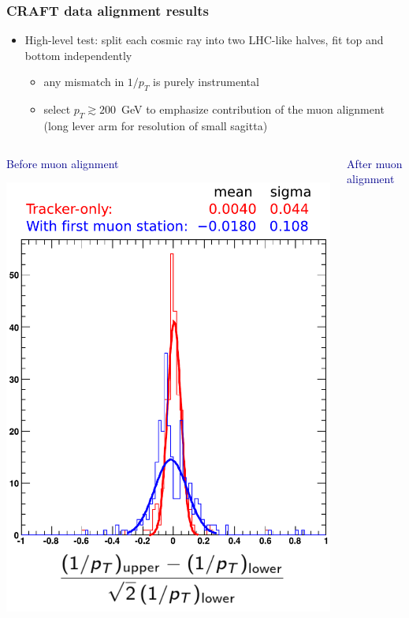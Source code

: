 \documentclass[compress]{beamer}
\begin{document}
\begin{frame}
\frametitle{CRAFT data alignment results}

\begin{itemize}
\item High-level test: split each cosmic ray into two LHC-like halves, fit top and bottom independently
\begin{itemize}
\item any mismatch in $1/p_T$ is purely instrumental
\item select $p_T \gtrsim 200$~GeV to emphasize contribution of the muon alignment (long lever arm for resolution of small sagitta)
\end{itemize}
\end{itemize}

\vspace{-0.5 cm}
\begin{columns}
\begin{center}
\textcolor{darkblue}{Before muon alignment}

\includegraphics[width=\linewidth]{without_alignment.pdf}
\end{center}
\begin{center}
\textcolor{darkblue}{After muon alignment}


\end{center}
\end{columns}
\end{frame}
\end{document}
